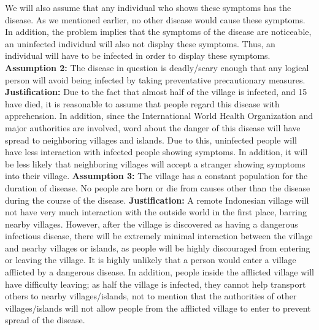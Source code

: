 \documentclass[12pt]{article}
\begin{document}
We will also assume that any individual who shows these symptoms has the disease. As we mentioned earlier, no other disease would cause these symptoms. In addition, the problem implies that the symptoms of the disease are noticeable, an uninfected individual will also not display these symptoms. Thus, an individual will have to be infected in order to display these symptoms.
\newline
\newline
\textbf{Assumption 2:} The disease in question is deadly/scary enough that any logical person will avoid being infected by taking preventative precautionary measures.
\newline
\textbf{Justification:} Due to the fact that almost half of the village is infected, and 15 have died, it is reasonable to assume that people regard this disease with apprehension. In addition, since the International World Health Organization and major authorities are involved, word about the danger of this disease will have spread to neighboring villages and islands. Due to this, uninfected people will have less interaction with infected people showing symptoms. In addition, it will be less likely that neighboring villages will accept a stranger showing symptoms into their village.
\newline
\newline
\textbf{Assumption 3:} The village has a constant population for the duration of disease. No people are born or die from causes other than the disease during the course of the disease.
\newline
\textbf{Justification:} A remote Indonesian village will not have very much interaction with the outside world in the first place, barring nearby villages. However, after the village is discovered as having a dangerous infectious disease, there will be extremely minimal interaction between the village and nearby villages or islands, as people will be highly discouraged from entering or leaving the village. It is highly unlikely that a person would enter a village afflicted by a dangerous disease. In addition, people inside the afflicted village will have difficulty leaving; as half the village is infected, they cannot help transport others to nearby villages/islands, not to mention that the authorities of other villages/islands will not allow people from the afflicted village to enter to prevent spread of the disease.
\end{document}
